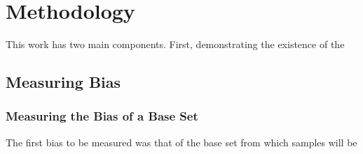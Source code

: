 \chapter{Methodology}\label{ch:methodology}
This work has two main components.  First, demonstrating the existence of the 


\section{Measuring Bias}
\subsection{Measuring the Bias of a Base Set}
The first bias to be measured was that of the base set from which samples will be 